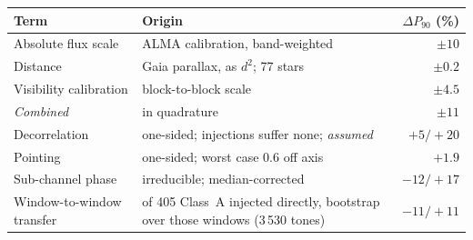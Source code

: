 \begin{tabular}{@{}l@{~}>{\raggedright\arraybackslash}p{}@{~}r@{}}
\hline
Term & Origin & $\Delta P_{90}$ (\%) \\
\hline
Absolute flux scale & ALMA calibration, band-weighted & $\pm10$ \\
Distance & Gaia parallax, as $d^{2}$; 77 stars & $\pm0.2$ \\
Visibility calibration & block-to-block scale & $\pm4.5$ \\
\hline
\emph{Combined} & in quadrature & $\pm11$ \\
\hline
Decorrelation & one-sided; injections suffer none; \emph{assumed} & $+5/+20$ \\
Pointing & one-sided; worst case 0.6\arcsec{} off axis & $+1.9$ \\
Sub-channel phase & irreducible; median-corrected & $-12/+17$ \\
Window-to-window transfer & 49 of 405 Class~A injected directly, bootstrap over those windows (3\,530 tones) & $-11/+11$ \\
\hline
\end{tabular}
